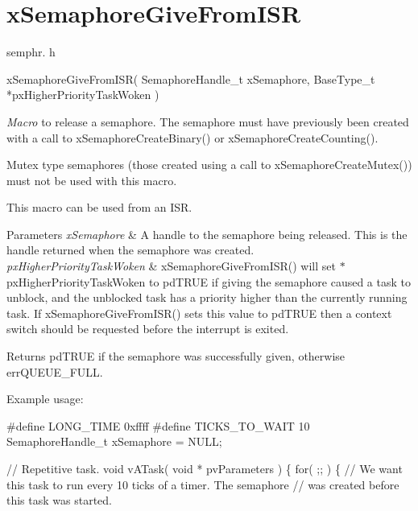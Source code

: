 \hypertarget{group__x_semaphore_give_from_i_s_r}{}\section{x\+Semaphore\+Give\+From\+I\+SR}
\label{group__x_semaphore_give_from_i_s_r}
semphr. h 
\begin{DoxyPre}
xSemaphoreGiveFromISR(
                         SemaphoreHandle\_t xSemaphore,
                         BaseType\_t *pxHigherPriorityTaskWoken
                     )\end{DoxyPre}


{\itshape Macro} to release a semaphore. The semaphore must have previously been created with a call to x\+Semaphore\+Create\+Binary() or x\+Semaphore\+Create\+Counting().

Mutex type semaphores (those created using a call to x\+Semaphore\+Create\+Mutex()) must not be used with this macro.

This macro can be used from an I\+SR.


\begin{DoxyParams}{Parameters}
{\em x\+Semaphore} & A handle to the semaphore being released. This is the handle returned when the semaphore was created.\\
\hline
{\em px\+Higher\+Priority\+Task\+Woken} & x\+Semaphore\+Give\+From\+I\+S\+R() will set $\ast$px\+Higher\+Priority\+Task\+Woken to pd\+T\+R\+UE if giving the semaphore caused a task to unblock, and the unblocked task has a priority higher than the currently running task. If x\+Semaphore\+Give\+From\+I\+S\+R() sets this value to pd\+T\+R\+UE then a context switch should be requested before the interrupt is exited.\\
\hline
\end{DoxyParams}
\begin{DoxyReturn}{Returns}
pd\+T\+R\+UE if the semaphore was successfully given, otherwise err\+Q\+U\+E\+U\+E\+\_\+\+F\+U\+LL.
\end{DoxyReturn}
Example usage\+: 
\begin{DoxyPre}
\#define LONG\_TIME 0xffff
\#define TICKS\_TO\_WAIT  10
SemaphoreHandle\_t xSemaphore = NULL;\end{DoxyPre}



\begin{DoxyPre}// Repetitive task.
void vATask( void * pvParameters )
\{
   for( ;; )
   \{
       // We want this task to run every 10 ticks of a timer.  The semaphore
       // was created before this task was started.\end{DoxyPre}



